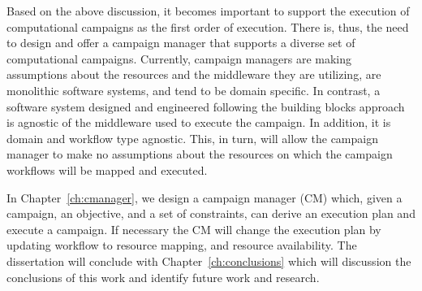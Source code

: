 Based on the above discussion, it becomes important to support the execution of computational campaigns as the first order of execution.
There is, thus, the need to design and offer a campaign manager that supports a diverse set of computational campaigns.
Currently, campaign managers are making assumptions about the resources and the middleware they are utilizing, are monolithic software systems, and tend to be domain specific.
In contrast, a software system designed and engineered following the building blocks approach~\cite{turilli2019middleware} is agnostic of the middleware used to execute the campaign.
In addition, it is domain and workflow type agnostic.
This, in turn, will allow the campaign manager to make no assumptions about the resources on which the campaign workflows will be mapped and executed.


In Chapter~\ref{ch:cmanager}, we design a campaign manager (CM) which, given a campaign, an objective, and a set of constraints, can derive an execution plan and execute a campaign.
If necessary the CM will change the execution plan by updating workflow to resource mapping, and resource availability.
The dissertation will conclude with Chapter~\ref{ch:conclusions} which will discussion the conclusions of this work and identify future work and research.

